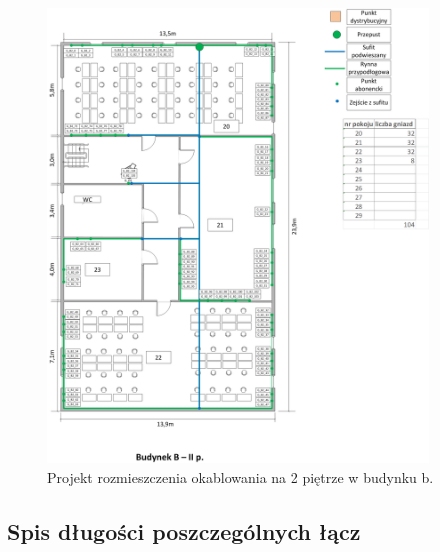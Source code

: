 \documentclass{report}
\begin{document}
\begin{figure}[H]
  \centering
      \includegraphics[width=0.9\textwidth]{./obrazki/kable/b2.png}
  \caption{Projekt rozmieszczenia okablowania na 2 piętrze w budynku b.}
\end{figure}


\subsection{Spis długości poszczególnych łącz}
\end{document}
